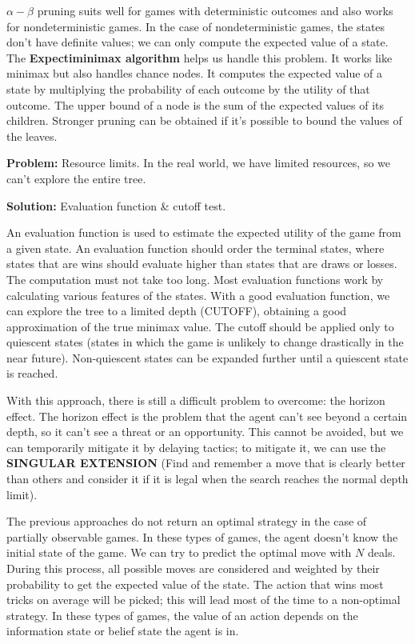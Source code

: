 \documentclass[12pt]{article}
\begin{document}
\begin{enumerate}[label=\textbf{AS.\arabic*}]
          $\alpha - \beta$ pruning suits well for games with deterministic outcomes and also works for nondeterministic games. In the case of nondeterministic games, the states don't have definite values; we can only compute the expected value of a state. The \textbf{Expectiminimax algorithm} helps us handle this problem. It works like minimax but also handles chance nodes. It computes the expected value of a state by multiplying the probability of each outcome by the utility of that outcome. The upper bound of a node is the sum of the expected values of its children. Stronger pruning can be obtained if it's possible to bound the values of the leaves.

          \textbf{Problem:} Resource limits. In the real world, we have limited resources, so we can't explore the entire tree.

          \textbf{Solution:} Evaluation function \& cutoff test.

          An evaluation function is used to estimate the expected utility of the game from a given state. An evaluation function should order the terminal states, where states that are wins should evaluate higher than states that are draws or losses. The computation must not take too long. Most evaluation functions work by calculating various features of the states. With a good evaluation function, we can explore the tree to a limited depth (CUTOFF), obtaining a good approximation of the true minimax value. The cutoff should be applied only to quiescent states (states in which the game is unlikely to change drastically in the near future). Non-quiescent states can be expanded further until a quiescent state is reached.

          With this approach, there is still a difficult problem to overcome: the horizon effect. The horizon effect is the problem that the agent can't see beyond a certain depth, so it can't see a threat or an opportunity. This cannot be avoided, but we can temporarily mitigate it by delaying tactics; to mitigate it, we can use the \textbf{SINGULAR EXTENSION} (Find and remember a move that is clearly better than others and consider it if it is legal when the search reaches the normal depth limit).

          The previous approaches do not return an optimal strategy in the case of partially observable games. In these types of games, the agent doesn't know the initial state of the game. We can try to predict the optimal move with $N$ deals. During this process, all possible moves are considered and weighted by their probability to get the expected value of the state. The action that wins most tricks on average will be picked; this will lead most of the time to a non-optimal strategy. In these types of games, the value of an action depends on the information state or belief state the agent is in.


\end{enumerate}
\end{document}

